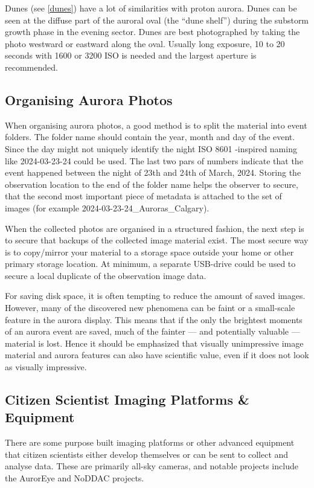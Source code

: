 \documentclass{article}
\begin{document}
Dunes (see \ref{dunes}) have a lot of similarities with proton aurora. Dunes can be seen at the diffuse part of the auroral oval (the ``dune shelf'') during the substorm growth phase in the evening sector. Dunes are best photographed by taking the photo westward or eastward along the oval. Usually long exposure, 10 to 20 seconds with 1600 or 3200 ISO is needed and the largest aperture is recommended.


\subsection{Organising Aurora Photos}\label{sec:data_cit_storage}

When organising aurora photos, a good method is to split the material into event folders. The folder name should contain the year, month and day of the event. Since the day might not uniquely identify the night ISO 8601 -inspired naming like 2024-03-23-24 could be used. The last two pars of numbers indicate that the event happened between the night of 23th and 24th of March, 2024. Storing the observation location to the end of the folder name helps the observer to secure, that the second most important piece of metadata is attached to the set of images (for example 2024-03-23-24\_Auroras\_Calgary).

When the collected photos are organised in a structured fashion, the next step is to secure that backups of the collected image material exist. The most secure way is to copy/mirror your material to a storage space outside your home or other primary storage location. At minimum, a separate USB-drive could be used to secure a local duplicate of the observation image data.

For saving disk space, it is often tempting to reduce the amount of saved images. However, many of the discovered new phenomena can be faint or a small-scale feature in the aurora display. This means that if the only the brightest moments of an aurora event are saved, much of the fainter --- and potentially valuable --- material is lost. Hence it should be emphasized that visually unimpressive image material and aurora features can also have scientific value, even if it does not look as visually impressive.



\subsection{Citizen Scientist Imaging Platforms \& Equipment}
There are some purpose built imaging platforms or other advanced equipment that citizen scientists either develop themselves or can be sent to collect and analyse data. These are primarily all-sky cameras, and notable projects include the AurorEye and NoDDAC projects.
\end{document}
